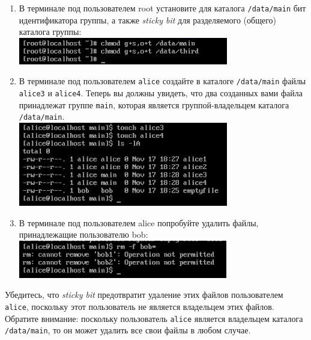 \documentclass[12pt]{article}
\begin{document}
\begin{enumerate}
	\item В терминале под пользователем root установите для каталога \texttt{/data/main} бит идентификатора группы, а также \textit{sticky bit} для разделяемого (общего) каталога группы:
	      \\\includegraphics{6.png}
	\item В терминале под пользователем \texttt{alice} создайте в каталоге \texttt{/data/main} файлы \texttt{alice3} и \texttt{alice4}. Теперь вы должны увидеть, что два созданных вами файла принадлежат группе \texttt{main}, которая является группой-владельцем каталога \texttt{/data/main}.
	      \\\includegraphics{7.png}
	\item В терминале под пользователем alice попробуйте удалить файлы, принадлежащие пользователю bob:
	      \\\includegraphics{8.png}
\end{enumerate}
Убедитесь, что \textit{sticky bit} предотвратит удаление этих файлов пользователем \texttt{alice}, поскольку этот пользователь не является владельцем этих файлов. Обратите внимание: поскольку пользователь \texttt{alice} является владельцем каталога \texttt{/data/main}, то он может удалить все свои файлы в любом случае.
\end{document}
